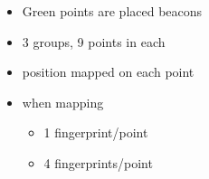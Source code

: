 
\begin{itemize}
\item Green points are placed beacons
\item 3 groups, 9 points in each
\item position mapped on each point
\item when mapping
\begin{itemize}
\item 1  fingerprint/point
\item 4 fingerprints/point
\end{itemize}
\end{itemize}
